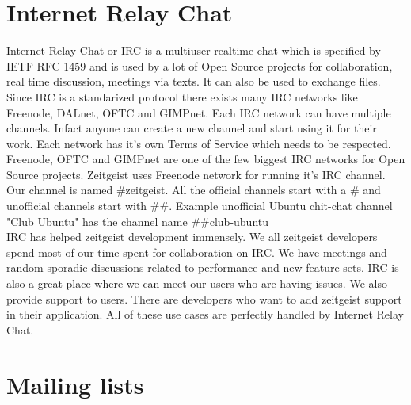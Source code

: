 \section{Internet Relay Chat}

Internet Relay Chat or IRC is a multiuser realtime chat which is specified by IETF RFC 1459 and is used 
by a lot of Open Source projects for collaboration, real time discussion, meetings via texts. It can also 
be used to exchange files.
\\

Since IRC is a standarized protocol there exists many IRC networks like Freenode, DALnet, OFTC and 
GIMPnet. Each IRC network can have multiple channels. Infact anyone can create a new channel and start 
using it for their work. Each network has it's own Terms of Service which needs to be respected.
\\

Freenode, OFTC and GIMPnet are one of the few biggest IRC networks for Open Source projects. Zeitgeist uses 
Freenode network for running it's IRC channel. Our channel is named \#zeitgeist. All the official channels 
start with a \# and unofficial channels start with \#\#. Example unofficial Ubuntu chit-chat channel "Club Ubuntu" 
has the channel name \#\#club-ubuntu
\\

IRC has helped zeitgeist development immensely. We all zeitgeist developers spend most of our time spent 
for collaboration on IRC. We have meetings and random sporadic discussions related to performance and new 
feature sets. IRC is also a great place where we can meet our users who are having issues. We also provide 
support to users. There are developers who want to add zeitgeist support in their application. All of these 
use cases are perfectly handled by Internet Relay Chat.

\section{Mailing lists}


